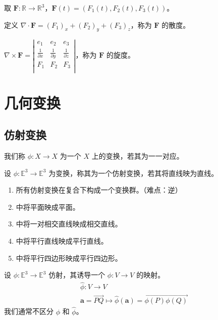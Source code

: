 \documentclass[lang=cn,10pt,thmcnt=section]{elegantbook}
\renewcommand{\vec}[1]{\mathbf{#1}}
\begin{document}
    取 $\vec{F}: \mathbb{R} \rightarrow \mathbb{R}^3$，$\vec{F}(t) = (F_1(t), F_2(t), F_3(t))$。
    
    \begin{definition}[散度]
    定义 $\nabla \cdot \vec{F} = (F_1)_x + (F_2)_y + (F_3)_z$，称为 $\vec{F}$ 的散度。
    \end{definition}
    
    \begin{definition}[旋度]
    $\nabla \times \vec{F} = \left| \begin{matrix}
        e_1&		e_2&		e_3\\
        \frac{1}{\partial x}&		\frac{1}{\partial y}&		\frac{1}{\partial z}\\
        F_1&		F_2&		F_3\\
    \end{matrix} \right|$，称为 $\vec{F}$ 的旋度。
    \end{definition}






\section{几何变换}
\subsection{仿射变换}
\begin{definition}[线性变换]
    我们称 $\phi: X \rightarrow X$ 为一个 $X$ 上的变换，若其为一一对应。
\end{definition}
\begin{definition}[仿射变换]
    设 $\phi: \mathbb{E}^3 \rightarrow \mathbb{E}^3$ 为变换，称其为一个仿射变换，若其将直线映为直线。
\end{definition}
\begin{proposition}
    \begin{enumerate}
        \item 所有仿射变换在复合下构成一个变换群。（难点：逆）
        \item 中将平面映成平面。
        \item 中将一对相交直线映成相交直线。
        \item 中将平行直线映成平行直线。
        \item 中将平行四边形映成平行四边形。
    \end{enumerate}
\end{proposition}

\begin{definition}[诱导映射]
    设 $\phi: \mathbb{E}^3 \rightarrow \mathbb{E}^3$ 仿射，其诱导一个 $\widehat{\phi}:V \rightarrow V$ 的映射。
    \[
    \begin{aligned}
        &\widehat{\phi}: V \rightarrow V \\
        &\vec{a} = \overrightarrow{PQ} \mapsto \widehat{\phi}(\vec{a}) = \overrightarrow{\phi(P)\phi(Q)}
    \end{aligned}
    \]
    我们通常不区分 $\phi$ 和 $\widehat{\phi}$。
\end{definition}
\end{document}

